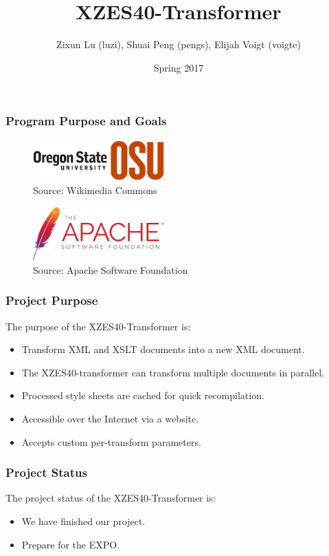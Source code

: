 \documentclass{beamer}
\title{XZES40-Transformer}
\author{Zixun Lu (luzi),
  Shuai Peng (pengs),
  Elijah Voigt (voigte)}
\institute{CS 463 | CS Senior Capstone | Group \#40}
\date{Spring 2017}
\begin{document}
 
\frame{\titlepage}

\begin{frame}
  \frametitle{Program Purpose and Goals }
\begin{figure}
  \centering
    \includegraphics[width=0.45\textwidth]{figures/osu-logo}
    \caption{Source: Wikimedia Commons \cite{osu-logo}}
\end{figure}

\begin{figure}
  \centering
    \includegraphics[width=0.45\textwidth]{figures/asf-logo}
    \caption{Source: Apache Software Foundation \cite{asf-logo}}
\end{figure}
\end{frame}

\begin{frame}
  \frametitle{Project Purpose}
  The purpose of the XZES40-Transformer is:
  \begin{itemize}
  \item Transform XML and XSLT documents into a new XML document.
  \item The XZES40-transformer can transform multiple documents in parallel. 
  \item Processed style sheets are cached for quick recompilation.
  \item Accessible over the Internet via a website.
  \item Accepts custom per-transform parameters.
  \end{itemize}
\end{frame}

\begin{frame}
  \frametitle{Project Status}
  The project status of the XZES40-Transformer is:
  \begin{itemize}
  	\item We have finished our project.
  	\item Prepare for the EXPO.
  \end{itemize}
\end{frame}
\end{document}
